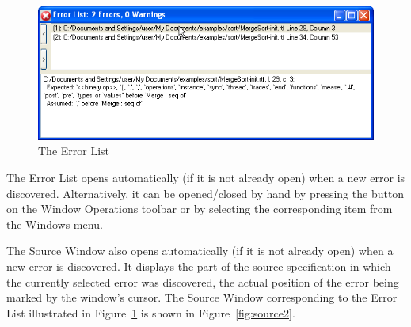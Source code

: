 \documentclass[\pformat,12pt]{article}
\newcommand{\guicmd}[1]{{\sf #1}}
\begin{document}
\begin{figure}[tbh]
\begin{center}
\includegraphics[width=\textwidth]{errorList-ppENG.png}
\caption{The Error List}
\label{fig:error2}
\end{center}
\end{figure}

The \guicmd{Error List} opens automatically (if it is not already
open) when a new error is discovered. Alternatively, it can be
opened/closed by hand by pressing the  
button on the \guicmd{Window Operations} toolbar or by
selecting the corresponding item from the \guicmd{Windows} menu.

The \guicmd{Source Window} also opens automatically (if it is not
already open) when a new error is discovered. It displays the part of 
the source specification in which the currently selected error was
discovered, the actual position of the error being marked by the
window's cursor. The \guicmd{Source Window} corresponding to the
\guicmd{Error List} illustrated in Figure~\ref{fig:error2} is shown in  
Figure~\ref{fig:source2}.
\end{document}
